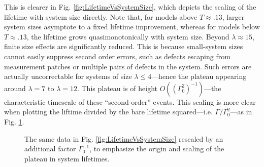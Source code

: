 \documentclass[twocolumn,superscriptaddress,aps,prb,floatfix]{revtex4-1}
\newcommand{\figref}[1]{Fig. \ref{#1}}
\begin{document}
This is clearer in \figref{fig:LifetimeVsSystemSize}, which depicts the scaling of the lifetime with system size directly.  Note that, for models above $T\approx.13$, larger system sizes asymptote to a fixed lifetime improvement, whereas for models below $T\approx.13$, the lifetime grows quasimonotonically with system size.  Beyond $\lambda\approx15$, finite size effects are significantly reduced.  This is because small-system sizes cannot easily suppress second order errors, such as defects escaping from measurement patches or multiple pairs of defects in the system.  Such errors are actually uncorrectable for systems of size $\lambda\leq4$---hence the plateau appearing around $\lambda=7$ to $\lambda=12$.  This plateau is of height $O((\Gamma_0^2)^{-1})$---the characteristic timescale of these ``second-order'' events.  This scaling is more clear when plotting the liftime divided by the bare lifetime squared---i.e. $\Gamma / \Gamma_0^2$---as in \figref{fig:LifetimeVsSystemSizeReduced}.

\begin{figure}
\begin{center}
\end{center}
\caption{The same data in \figref{fig:LifetimeVsSystemSize} rescaled by an additional factor $\Gamma_0^{-1}$, to emphasize the origin and scaling of the plateau in system lifetimes.}
\label{fig:LifetimeVsSystemSizeReduced}
\end{figure}
\end{document}
